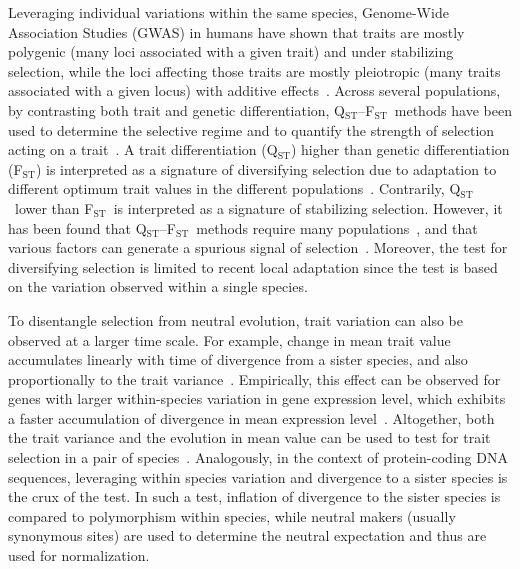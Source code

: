 \documentclass{article}
\newcommand{\Qst}{Q$_\text{ST}$}
\newcommand{\Fst}{F$_\text{ST}$}
\newcommand{\QstFst}{\Qst--\Fst}
\begin{document}
Leveraging individual variations within the same species, Genome-Wide Association Studies (GWAS) in humans have shown that traits are mostly polygenic (many loci associated with a given trait) and under stabilizing selection, while the loci affecting those traits are mostly pleiotropic (many traits associated with a given locus) with additive effects~\parencite{simons_population_2018, sella_thinking_2019}. 
Across several populations, by contrasting both trait and genetic differentiation, \QstFst\ methods have been used to determine the selective regime and to quantify the strength of selection acting on a trait~\parencite{merila_comparison_2001, leinonen_comparative_2008}.
A trait differentiation (\Qst) higher than genetic differentiation (\Fst) is interpreted as a signature of diversifying selection due to adaptation to different optimum trait values in the different populations~\parencite{lamy_qst_2012}.
Contrarily, \Qst\ lower than \Fst\ is interpreted as a signature of stabilizing selection.
However, it has been found that \QstFst\ methods require many populations~\parencite{ohara_bias_2005}, and that various factors can generate a spurious signal of selection~\parencite{pujol_are_2008, edelaar_comparisons_2011}.
Moreover, the test for diversifying selection is limited to recent local adaptation since the test is based on the variation observed within a single species.

To disentangle selection from neutral evolution, trait variation can also be observed at a larger time scale.
For example, change in mean trait value accumulates linearly with time of divergence from a sister species, and also proportionally to the trait variance~\parencite{lande_genetic_1980, turelli_heritable_1984}. %
Empirically, this effect can be observed for genes with larger within-species variation in gene expression level, which exhibits a faster accumulation of divergence in mean expression level~\parencite{khaitovich_neutral_2004}.
Altogether, both the trait variance and the evolution in mean value can be used to test for trait selection in a pair of species~\parencite{walsh_evolution_2018}.
Analogously, in the context of protein-coding DNA sequences, leveraging within species variation and divergence to a sister species is the crux of the \textcite{mcdonald_adaptative_1991} test. In such a test, inflation of divergence to the sister species is compared to polymorphism within species, while neutral makers (usually synonymous sites) are used to determine the neutral expectation and thus are used for normalization.
\end{document}
